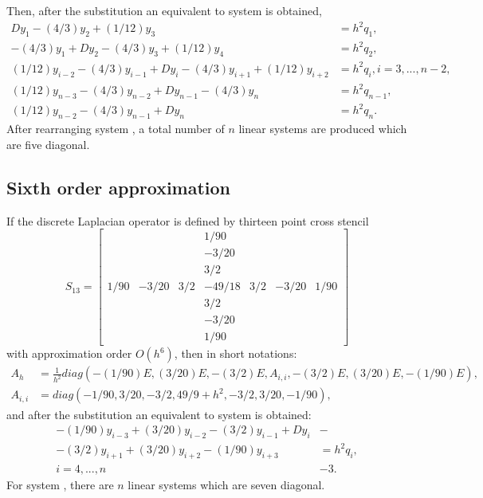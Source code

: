 \documentclass[11pt,a4paper,twoside]{article}
\begin{document}
Then, after the substitution  an equivalent to  system is obtained,
\begin{align}
Dy_1 - (4/3)y_2 + (1/12)y_3 &= h^2 q_1,\nonumber \\
-(4/3)y_1 + Dy_2 - (4/3)y_3 + (1/12)y_4  &= h^2 q_2,\nonumber \\
 (1/12)y_{i-2} - (4/3)y_{i-1} + D y_i - (4/3)y_{i+1} + (1/12)y_{i+2} &= h^2 q_i, i = 3,...,n-2,\nonumber \\
 (1/12)y_{n-3} - (4/3)y_{n-2} + Dy_{n-1} - (4/3)y_n &= h^2 q_{n-1}, \nonumber \\
 (1/12)y_{n-2} - (4/3)y_{n-1} + Dy_n &= h^2 q_n.\label{SubSys5}
\end{align}
After rearranging system , a total number of $n$ linear systems are produced which are five diagonal.

\subsection{Sixth order approximation}

If the discrete Laplacian operator is defined by thirteen point cross stencil
\[
S_{13} = 
\begin{bmatrix}
          &       &       &   1/90  & & &  \\
          &       &       &  -3/20  & & &  \\
          &       &       &   3/2     & &   & \\
1/90 & -3/20 &  3/2 & -49/18 & 3/2 & -3/20 & 1/90 \\
          &       &       &   3/2     & &   & \\
          &       &       &  -3/20  & & &  \\
          &       &       &   1/90  & & &
\end{bmatrix}
\]
with approximation order $O(h^6)$, then in short notations:
 \begin{align*} 
A_h &= \frac{1}{h^2}diag( -(1/90)E, (3/20)E, -(3/2)E, A_{i,i}, -(3/2)E, (3/20)E, -(1/90)E), \\
A_{i,i} & = diag(-1/90, 3/20, -3/2, 49/9 + h^2, -3/2, 3/20, -1/90),
\end{align*}
and after the substitution  an equivalent to  system is obtained:
\begin{align}
-(1/90)y_{i-3} + (3/20)y_{i-2} - (3/2)y_{i-1} + D y_i  &-\nonumber \\
  - (3/2)y_{i+1} + (3/20)y_{i+2} -  (1/90)y_{i+3} &= h^2 q_i,\nonumber \\
 i = 4,...,n  &-3. \label{SubSys7}
\end{align}
For system , there are $n$ linear systems which are seven diagonal. 
\end{document}
